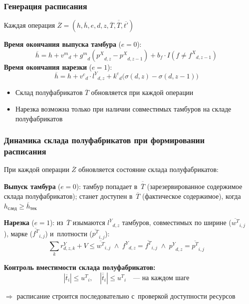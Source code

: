 \begin{frame}
    \frametitle{Генерация расписания}
    Каждая операция $\overline{Z}=(h,\overline{h},e,d,z,\overline{T},\overline{\overline{T}},\overline{t'})$

    \vspace{0.2cm}
    \textbf{Время окончания выпуска тамбура} ($e{=}0$):
    \[
    \overline{h}= h+{v^m}_d+{g^m}_d({p^X}_{d,z}-{p^X}_{d,z-1})+b_f\cdot I(f\ne{f^X}_{d,z-1})
    \]
    \textbf{Время окончания нарезки} ($e{=}1$):
    \[
    \overline{h}= h+{v^c}_d\cdot{l^Y}_{d,z}+{k^c}_d\bigl(\sigma(d,z)-\sigma(d,z{-}1)\bigr)
    \]
    \vspace{0.2cm}
    \begin{itemize}
        \item Склад полуфабрикатов $\overline{T}$ обновляется при каждой операции
        \item Нарезка возможна только при наличии совместимых тамбуров на складе полуфабрикатов
    \end{itemize}
\end{frame}

\begin{frame}
    \frametitle{Динамика склада полуфабрикатов при формировании расписания}
    \small
    При каждой операции $\overline{Z}$ обновляется состояние склада полуфабрикатов:

    \vspace{0.2cm}
    \textbf{Выпуск тамбура} ($e{=}0$): тамбур попадает в~$\overline{\overline{T}}$ (зарезервированное содержимое склада полуфабрикатов); станет доступен в~$\overline{T}$ (фактическое содержимое), когда $h_{\text{след}} \ge \overline{h}_{\text{тек}}$

    \vspace{0.2cm}
    \textbf{Нарезка} ($e{=}1$): из~$\overline{T}$ изымаются ${l^Y}_{d,z}$ тамбуров, совместимых по ширине ($\overline{w^T}_{i,j}$), марке ($\overline{f^T}_{i,j}$) и~плотности ($\overline{p^T}_{i,j}$):
    \[
    \sum_k r^Y_{d,z,k}+V\le\overline{w^T}_{i,j}\;\wedge\;{f^Y}_{d,z}=\overline{f^T}_{i,j}\;\wedge\;{p^Y}_{d,z}=\overline{p^T}_{i,j}
    \]

    \vspace{0.2cm}
    \textbf{Контроль вместимости склада полуфабрикатов:}
    \[
    |\overline{t}_i|\le{u^T}_i,\quad |\overline{\overline{t}}_i|\le{u^T}_i \quad\text{--- на каждом шаге}
    \]

    $\Rightarrow$ расписание строится последовательно с~проверкой доступности ресурсов
\end{frame}